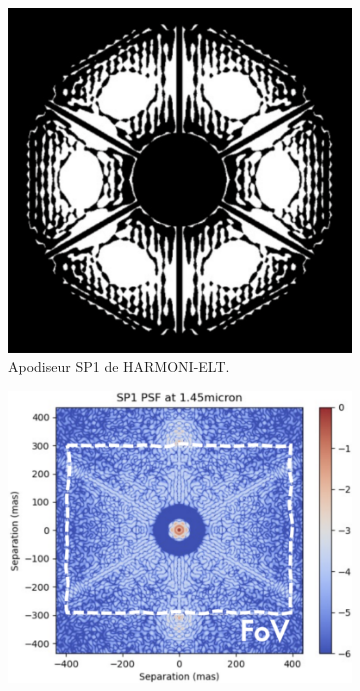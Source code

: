 \begin{figure}[htbp]
\centering
\begin{subfigure}[b]{0.40\textwidth}
\centering
\includegraphics[width=\textwidth]{figures/SP1_HARMONI.png}
\caption{Apodiseur SP1 de HARMONI-ELT.}
\label{fig:SP1}
\end{subfigure}
\hfill %
\begin{subfigure}[b]{0.45\textwidth}
\centering
\includegraphics[width=\textwidth]{figures/PSF_SP1_HARMONI.png}

\end{subfigure}
\end{figure}
